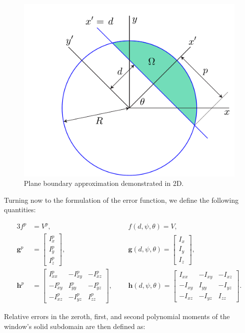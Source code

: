 \begin{linenomath}\begin{figure}[h]
	\centering
		\includegraphics[scale=0.3]{media/om/window.pdf}
	\caption{Plane boundary approximation demonstrated in 2D.}
	\label{fig:quad}
\end{figure}\end{linenomath}

Turning now to the formulation of the error function, we define the following quantities:
\begin{linenomath}\begin{alignat}{3}
f^p &= V^p, \text{\ \ \ \ \ }&&f(d,\psi,\theta) = V, \\
\bm{g}^p &= \left[\begin{array} {ccc} {I_x^p} \\ {I_y^p} \\ {I_z^p} \end{array} \right], \text{\ \ \ \ \ }&&\bm{g}(d,\psi,\theta) = \left[\begin{array} {ccc} {I_x} \\ {I_y} \\ {I_z} \end{array} \right], \\
\bm{h}^p &= \left[\begin{array} {ccc} {I_{xx}^p} & {-I_{xy}^p} & {-I_{xz}^p}\\ {-I_{xy}^p} & {I_{yy}^p} & {-I_{yz}^p} \\ -{I_{xz}^p} & {-I_{yz}^p} & {I_{zz}^p} \end{array} \right],\text{\ \ \ \ \ \ \ }&&\bm{h}(d,\psi,\theta) = \left[\begin{array} {ccc} {I_{xx}} & {-I_{xy}} & {-I_{xz}}\\ {-I_{xy}} & {I_{yy}} & {-I_{yz}} \\ -{I_{xz}} & {-I_{yz}} & {I_{zz}} \end{array} \right].
\end{alignat}\end{linenomath}
Relative errors in the zeroth, first, and second polynomial moments of the window's solid subdomain are then defined as:

